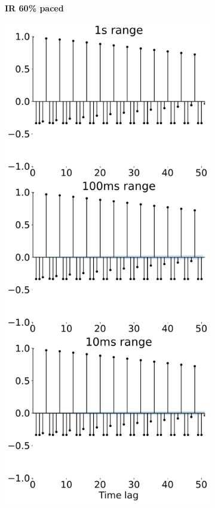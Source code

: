 \begin{figure}[t]
\begin{subfigure}[t]{.24\linewidth}
		\vspace{-6mm}
		\caption{\textbf{IR 60\% paced}}
		\label{fig:app-pacing-autocorr-rack-60}
	\end{subfigure}
     \begin{subfigure}[t]{.24\linewidth}
		\centering\includegraphics[width=1\linewidth]{figs/intra_rack_autocor_100.pdf}

\end{subfigure}
\end{figure}

